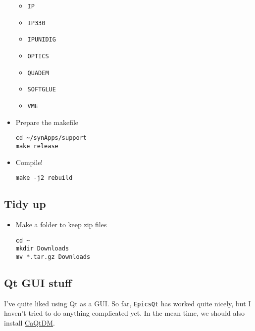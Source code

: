 \documentclass[11pt]{article}
\begin{document}
\begin{itemize}
\begin{itemize}
\item \verb~IP~
\item \verb~IP330~
\item \verb~IPUNIDIG~
\item \verb~OPTICS~
\item \verb~QUADEM~
\item \verb~SOFTGLUE~
\item \verb~VME~
\end{itemize}
\item Prepare the makefile
\begin{verbatim}
cd ~/synApps/support
make release
\end{verbatim}
\item Compile!
\begin{verbatim}
make -j2 rebuild
\end{verbatim}
\end{itemize}
\subsection{Tidy up}
\label{sec-1-4}
\begin{itemize}
\item Make a folder to keep zip files
\begin{verbatim}
cd ~
mkdir Downloads
mv *.tar.gz Downloads
\end{verbatim}
\end{itemize}
\subsection{Qt GUI stuff}
\label{sec-1-5}
I've quite liked using Qt as a GUI. So far, \texttt{EpicsQt} has worked
quite nicely, but I haven't tried to do anything complicated
yet. In the mean time, we should also install \href{http://epics.web.psi.ch/software/caqtdm/}{CaQtDM}.
\end{document}
